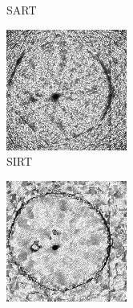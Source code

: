 \documentclass[journal]{IEEEtran}
\begin{document}
\begin{figure}[!h]
\begin{subfigure}[b]{0.24\linewidth}
        \caption{SART}
     \end{subfigure}
    \begin{subfigure}[b]{0.24\linewidth}
        \includegraphics[width=\textwidth]{../images/potato/post_tci/comparison/weightsIm_sirt30.png}
        \caption{SIRT}
    \end{subfigure}
        \begin{subfigure}[b]{0.24\linewidth}
        \includegraphics[width=\textwidth]{../images/potato/post_tci/comparison/weightsIm_tv30.png}

\end{subfigure}
\end{figure}
\end{document}
